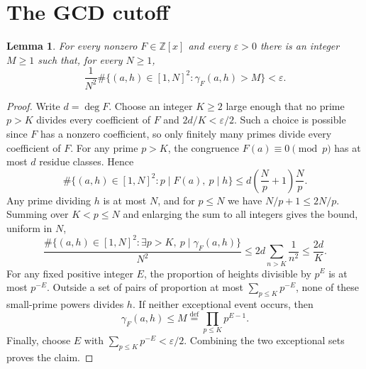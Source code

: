 \documentclass[10pt]{amsart}
\newtheorem{lemma}[theorem]{Lemma}
\theoremstyle{remark}
\newcommand{\Z}{\mathbb{Z}}
\newcommand{\defeq}{\stackrel{\mathrm{def}}{=}}
\begin{document}
\section{The GCD cutoff}\label{sec:cutoff}
\begin{lemma}\label{lem:tight}
For every nonzero $F\in\Z[x]$ and every $\varepsilon>0$ there is an
integer $M\geq1$ such that, for every $N\geq1$,
\[
 \frac1{N^2}
 \#\{(a,h)\in[1,N]^2:\gamma_F(a,h)>M\}<\varepsilon.
\]
\end{lemma}
\begin{proof}
Write $d=\deg F$. Choose an integer $K\geq2$ large enough that no prime
$p>K$ divides every coefficient of $F$ and $2d/K<\varepsilon/2$.
Such a choice is possible since $F$ has a nonzero coefficient, so only
finitely many primes divide every coefficient of $F$. For any prime $p>K$, the congruence $F(a)\equiv0\pmod p$
has at most $d$ residue classes. Hence
\[
 \#\{(a,h)\in[1,N]^2:p\mid F(a),\ p\mid h\}
 \leq d\left(\frac Np+1\right)\frac Np.
\]
Any prime dividing $h$ is at most $N$, and for $p\leq N$ we have
$N/p+1\leq2N/p$. Summing over $K<p\leq N$ and enlarging the sum to
all integers gives the bound, uniform in $N$,
\begin{equation}\label{eq:large-primes}
 \frac{\#\{(a,h)\in[1,N]^2:\exists p>K,\ p\mid\gamma_F(a,h)\}}{N^2}
 \leq 2d\sum_{n>K}\frac1{n^2}\leq\frac{2d}{K}.
\end{equation}
For any fixed positive integer $E$,
the proportion of heights divisible by $p^E$ is at most $p^{-E}$.
Outside a set of pairs of proportion at most
$\sum_{p\leq K}p^{-E}$, none of these small-prime powers divides $h$.
If neither exceptional event occurs, then
\[
       \gamma_F(a,h)\leq M\defeq\prod_{p\leq K}p^{E-1}.
\]
Finally, choose $E$ with $\sum_{p\leq K}p^{-E}<\varepsilon/2$. Combining the two exceptional
sets proves the claim.
\end{proof}
\end{document}

